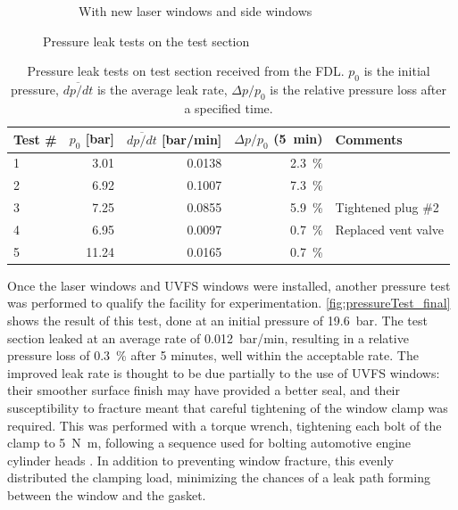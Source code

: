 \begin{figure}[h]
\begin{subfigure}[t]{0.47\textwidth}
                    \caption{With new laser windows and side windows}
                    \label{fig:pressureTest_final}
                \end{subfigure}
                \caption{Pressure leak tests on the test section}
                \label{fig:pressureTest}
            \end{figure}

            \begin{table}[h]
                \centering
                \caption[Pressure leak tests on test section]{Pressure leak tests on test section received from the FDL. $p_0$ is the initial pressure, $\overline{dp/dt}$ is the average leak rate, $\Delta p/p_0$ is the relative pressure loss after a specified time.}
                \label{tab:pressureTests_og}
                \begin{tabular}{lrrrl}
                    \toprule
                    Test \#  & $p_0$ [bar]  & $\overline{dp/dt}$ [bar/min]   & $\Delta p/p_0$ (5~min) & Comments \\
                    \midrule
                    1   & 3.01  & 0.0138    & 2.3~\%    &   \\
                    2   & 6.92  & 0.1007    & 7.3~\%    &   \\
                    3   & 7.25  & 0.0855    & 5.9~\%    & Tightened plug \#2  \\
                    4   & 6.95  & 0.0097    & 0.7~\%    & Replaced vent valve  \\
                    5   & 11.24 & 0.0165    & 0.7~\%    &   \\
                    \bottomrule
                \end{tabular}
            \end{table}

            Once the laser windows and UVFS windows were installed, another pressure test was performed to qualify the facility for experimentation. \autoref{fig:pressureTest_final} shows the result of this test, done at an initial pressure of \qty{19.6}{bar}. The test section leaked at an average rate of \qty{0.012}{bar/min}, resulting in a relative pressure loss of 0.3~\% after 5 minutes, well within the acceptable rate. The improved leak rate is thought to be due partially to the use of UVFS windows: their smoother surface finish may have provided a better seal, and their susceptibility to fracture meant that careful tightening of the window clamp was required. This was performed with a torque wrench, tightening each bolt of the clamp to \qty{5}{N.m}, following a sequence used for bolting automotive engine cylinder heads
            . In addition to preventing window fracture, this evenly distributed the clamping load, minimizing the chances of a leak path forming between the window and the gasket.

